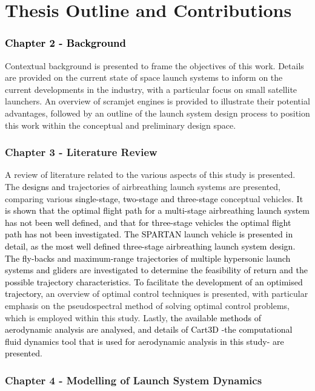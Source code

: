   \clearpage
  \section{Thesis Outline and Contributions}

    \textcolor{black}{
    \subsubsection*{Chapter 2 - Background}
}
	Contextual background is presented to frame the objectives of this work. Details are provided on the current state of space launch systems to inform on the current developments in the industry, with a particular focus on small satellite launchers. An overview of scramjet engines is provided to illustrate their potential advantages, followed by an outline of the launch system design process to position this work within the conceptual and preliminary design space.

    \subsubsection*{Chapter 3 - Literature Review}
      A review of literature related to the various aspects of this study is presented. The \textcolor{black}{designs and }trajectories of airbreathing launch systems are presented, comparing various \textcolor{black}{single-stage, two-stage and three-stage} conceptual vehicles. \textcolor{black}{It is shown that the optimal flight path for a multi-stage airbreathing launch system has not been well defined, and that for three-stage vehicles the optimal flight path has not been investigated. The SPARTAN launch vehicle is presented in detail, as the most well defined three-stage airbreathing launch system design. The fly-backs and maximum-range trajectories of multiple hypersonic launch systems and gliders are investigated to determine the feasibility of return and the possible trajectory characteristics.} \textcolor{black}{To facilitate the development of an optimised trajectory, }an overview of optimal control techniques is presented, with particular emphasis on the pseudospectral method of solving optimal control problems, which is employed within this study. Lastly, \textcolor{black}{the available methods of aerodynamic analysis are analysed, and details of Cart3D -the computational fluid dynamics tool that is used for aerodynamic analysis in this study- are presented}.
      

    \subsubsection*{Chapter 4 - Modelling of Launch System Dynamics}

